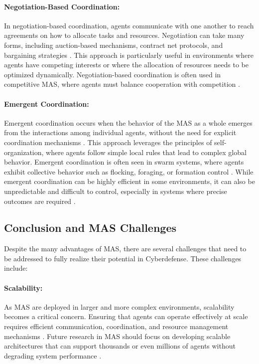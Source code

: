 \paragraph{Negotiation-Based Coordination:}
In negotiation-based coordination, agents communicate with one another to reach agreements on how to allocate tasks and resources. Negotiation can take many forms, including auction-based mechanisms, contract net protocols, and bargaining strategies \cite{durfee1989negotiating}. This approach is particularly useful in environments where agents have competing interests or where the allocation of resources needs to be optimized dynamically. Negotiation-based coordination is often used in competitive MAS, where agents must balance cooperation with competition \cite{weiss1999multiagent}.

\paragraph{Emergent Coordination:}
Emergent coordination occurs when the behavior of the MAS as a whole emerges from the interactions among individual agents, without the need for explicit coordination mechanisms \cite{dorigo2000ant}. This approach leverages the principles of self-organization, where agents follow simple local rules that lead to complex global behavior. Emergent coordination is often seen in swarm systems, where agents exhibit collective behavior such as flocking, foraging, or formation control \cite{weiss1999multiagent}. While emergent coordination can be highly efficient in some environments, it can also be unpredictable and difficult to control, especially in systems where precise outcomes are required \cite{dorigo2000ant}.

\subsection{Conclusion and MAS Challenges}

Despite the many advantages of MAS, there are several challenges that need to be addressed to fully realize their potential in Cyberdefense. These challenges include:

\paragraph{Scalability:}
As MAS are deployed in larger and more complex environments, scalability becomes a critical concern. Ensuring that agents can operate effectively at scale requires efficient communication, coordination, and resource management mechanisms \cite{buczak2016survey}. Future research in MAS should focus on developing scalable architectures that can support thousands or even millions of agents without degrading system performance \cite{buczak2016survey}.

